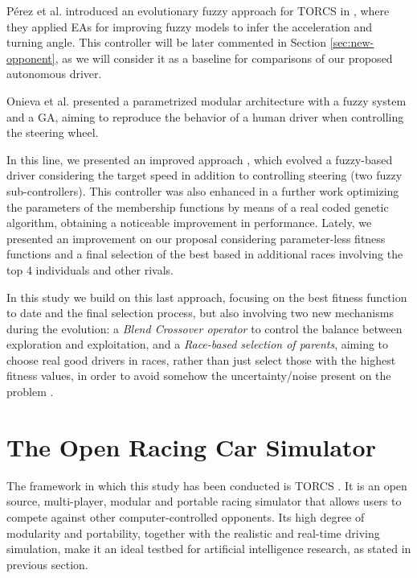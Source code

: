\documentclass[conference]{IEEEtran}
\begin{document}
P{\'e}rez et al. introduced an evolutionary fuzzy approach for TORCS
in \cite{PerezEvolvingFuzzy09}, where they applied EAs for improving
fuzzy models to infer the acceleration and turning angle. This
controller will be later commented in Section \ref{sec:new-opponent},
as we will consider it as a baseline for comparisons of our proposed
autonomous driver. 

Onieva et al. \cite{LFAG} presented a parametrized modular
architecture with a fuzzy system and a GA, aiming to reproduce the
behavior of a human driver when controlling the steering wheel.  

In this line, we presented an improved approach \cite{salem_evo17}, which evolved a fuzzy-based driver considering the target speed in addition to controlling steering (two fuzzy sub-controllers).
This controller was also enhanced in a further work \cite{salem_evo18}
optimizing the parameters of the membership functions by means of a
real coded genetic algorithm, obtaining a noticeable improvement in
performance. Lately, we presented \cite{salem_cig2018} an improvement on our proposal considering parameter-less fitness functions and a final selection of the best based in additional races involving the top 4 individuals and other rivals.

In this study we build on this last approach, focusing on the best
fitness function to date and the final selection process, but also
involving two new mechanisms during the evolution: a \textit{Blend
  Crossover operator} to control the balance between exploration and
exploitation, and a \textit{Race-based selection of parents}, aiming
to choose real good drivers in races, rather than just select those
with the highest fitness values, in order to avoid somehow the
uncertainty/noise present on the problem
\cite{merelo2016statistical}. 



\section{The Open Racing Car Simulator}
\label{sec:torcs}

The framework in which this study has been conducted is TORCS \cite{torcs4}. It is an open source, multi-player, modular and portable racing simulator that allows users to compete against other computer-controlled opponents.
Its high degree of modularity and portability, together with the
realistic and real-time driving simulation, make it an ideal testbed
for artificial intelligence research, as stated in previous section.
\end{document}
